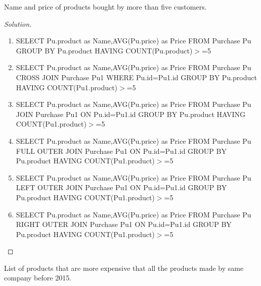 \documentclass[10pt,a4paper]{article}
\newenvironment{problem}[2][Problem]{\begin{trivlist}
\item[\hskip \labelsep {\bfseries #1}\hskip \labelsep {\bfseries #2.}]}{\end{trivlist}}
\begin{document}
\begin{problem}{7}
Name and price of products bought by more than five customers.
\end{problem}

\begin{proof}[Solution]
\begin{enumerate}
	\item SELECT Pu.product as Name,AVG(Pu.price) as Price FROM Purchase Pu GROUP BY Pu.product HAVING COUNT(Pu.product)$>$=5
	\item SELECT Pu.product as Name,AVG(Pu.price) as Price FROM Purchase Pu CROSS JOIN Purchase Pu1 WHERE Pu.id=Pu1.id GROUP BY Pu.product HAVING COUNT(Pu1.product)$>$=5
	\item  SELECT Pu.product as Name,AVG(Pu.price) as Price FROM Purchase Pu JOIN Purchase Pu1 ON Pu.id=Pu1.id GROUP BY Pu.product HAVING COUNT(Pu1.product)$>$=5
	\item SELECT Pu.product as Name,AVG(Pu.price) as Price FROM Purchase Pu FULL OUTER JOIN Purchase Pu1 ON Pu.id=Pu1.id GROUP BY Pu.product HAVING COUNT(Pu1.product)$>$=5
	\item SELECT Pu.product as Name,AVG(Pu.price) as Price FROM Purchase Pu LEFT OUTER JOIN Purchase Pu1 ON Pu.id=Pu1.id GROUP BY Pu.product HAVING COUNT(Pu1.product)$>$=5
	\item SELECT Pu.product as Name,AVG(Pu.price) as Price FROM Purchase Pu RIGHT OUTER JOIN Purchase Pu1 ON Pu.id=Pu1.id GROUP BY Pu.product HAVING COUNT(Pu1.product)$>$=5
\end{enumerate}
\end{proof}

\begin{problem}{8}
List of products that are more expensive that all the products made by same company before 2015.
\end{problem}
\end{document}
